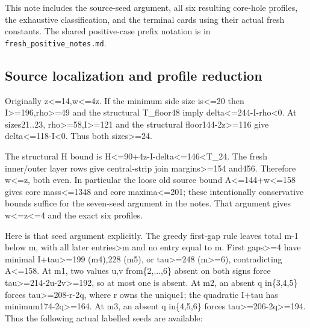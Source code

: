 \documentclass[10pt,a4paper]{article}
\theoremstyle{definition}
\begin{document}
This note includes the source-seed argument,\allowbreak{} all six resulting core-hole
profiles,\allowbreak{} the exhaustive classification,\allowbreak{} and the terminal cards using
their actual fresh constants. The shared positive-case prefix notation
is in \texttt{fresh\_\allowbreak{}\allowbreak{}positive\_\allowbreak{}\allowbreak{}notes.md}.

\hypertarget{source-localization-and-profile-reduction}{%
\subsection{Source localization and profile
reduction}\label{source-localization-and-profile-reduction}}

Originally z\textless=\allowbreak{}14,\allowbreak{}w\textless=\allowbreak{}4z. If the minimum side size
is\textless=\allowbreak{}20 then I\textgreater=\allowbreak{}196,\allowbreak{}rho\textgreater=\allowbreak{}49 and the
structural T\_\allowbreak{}floor48 imply delta\textless=\allowbreak{}244-I-rho\textless0. At
sizes21..23,\allowbreak{} rho\textgreater=\allowbreak{}58,\allowbreak{}I\textgreater=\allowbreak{}121 and the structural
floor144-2z\textgreater=\allowbreak{}116 give delta\textless=\allowbreak{}118-I\textless0. Thus
both sizes\textgreater=\allowbreak{}24.

The structural H bound is
H\textless=\allowbreak{}90+\allowbreak{}4z-I-delta\textless=\allowbreak{}146\textless T\_\allowbreak{}24. The fresh
inner/outer layer rows give central-strip join margins\textgreater=\allowbreak{}154
and456. Therefore w\textless=\allowbreak{}z,\allowbreak{} both even. In particular the loose old
source bound A\textless=\allowbreak{}144+\allowbreak{}w\textless=\allowbreak{}158 gives core mass\textless=\allowbreak{}1348
and core maxima\textless=\allowbreak{}201; these intentionally conservative bounds
suffice for the seven-seed argument in the notes. That argument gives
w\textless=\allowbreak{}z\textless=\allowbreak{}4 and the exact six profiles.

Here is that seed argument explicitly. The greedy first-gap rule leaves
total m-1 below m,\allowbreak{} with all later entries\textgreater m and no entry
equal to m. First gaps\textgreater=\allowbreak{}4 have minimal I+\allowbreak{}tau\textgreater=\allowbreak{}199
(m4),\allowbreak{}228 (m5),\allowbreak{} or tau\textgreater=\allowbreak{}248 (m\textgreater=\allowbreak{}6),\allowbreak{} contradicting
A\textless=\allowbreak{}158. At m1,\allowbreak{} two values u,\allowbreak{}v from\{2,\allowbreak{}...,\allowbreak{}6\} absent on both
signs force tau\textgreater=\allowbreak{}214-2u-2v\textgreater=\allowbreak{}192,\allowbreak{} so at most one is
absent. At m2,\allowbreak{} an absent q in\{3,\allowbreak{}4,\allowbreak{}5\} forces tau\textgreater=\allowbreak{}208-r-2q,\allowbreak{}
where r owns the unique1; the quadratic I+\allowbreak{}tau has
minimum174-2q\textgreater=\allowbreak{}164. At m3,\allowbreak{} an absent q in\{4,\allowbreak{}5,\allowbreak{}6\} forces
tau\textgreater=\allowbreak{}206-2q\textgreater=\allowbreak{}194. Thus the following actual
labelled seeds are available:
\end{document}

